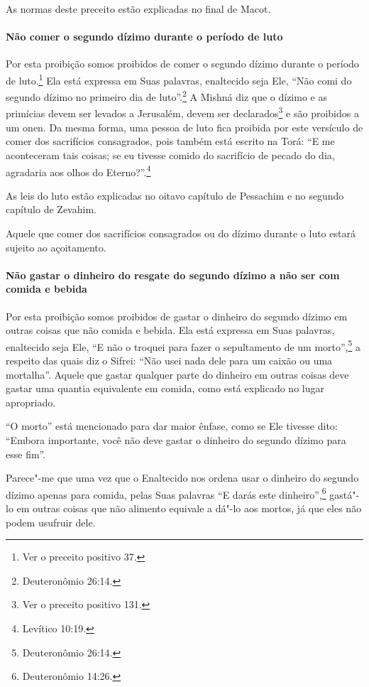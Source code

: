 \begin{multicols}{2}
As normas deste preceito estão explicadas no final de Macot\starr.

\paragraph{Não comer o segundo dízimo durante o período de luto}

Por esta proibição somos proibidos de comer o segundo dízimo durante o
período de luto.\footnote{Ver o preceito positivo 37.} Ela está expressa em Suas
palavras, enaltecido seja Ele, ``Não comi do segundo dízimo no primeiro
dia de luto''.\footnote{Deuteronômio 26:14.} A Mishná\starr{} diz que o dízimo e as
primícias devem ser levados a Jerusalém, devem ser
declarados\footnote{Ver o preceito positivo 131.} e são proibidos a um onen\starr. Da mesma forma, uma pessoa de luto fica
proibida por este versículo de comer dos sacrifícios consagrados, pois
também está escrito na Torá\starr: ``E me aconteceram tais coisas; se eu
tivesse comido do sacrifício de pecado do dia, agradaria aos olhos do
Eterno?''.\footnote{Levítico 10:19.}

As leis do luto estão explicadas no oitavo capítulo de Pessachim\starr{} e no
segundo capítulo de Zevahim\starr.

Aquele que comer dos sacrifícios consagrados ou do dízimo durante o
luto estará sujeito ao açoitamento.

\paragraph{Não gastar o dinheiro do resgate do segundo dízimo a não ser com
comida e bebida}

Por esta proibição somos proibidos de gastar o dinheiro do segundo
dízimo em outras coisas que não comida e bebida. Ela está expressa em
Suas palavras, enaltecido seja Ele, ``E não o troquei para fazer o
sepultamento de um morto'',\footnote{Deuteronômio 26:14.} a respeito das quais
diz o Sifrei\starr: ``Não usei nada dele para um caixão ou uma mortalha''.
Aquele que gastar qualquer parte do dinheiro em outras coisas deve
gastar uma quantia equivalente em comida, como está explicado no lugar
apropriado.

``O morto'' está mencionado para dar maior ênfase, como se Ele tivesse
dito: ``Embora importante, você não deve gastar o dinheiro do segundo
dízimo para esse fim''.

Parece"-me que uma vez que o Enaltecido nos ordena usar o dinheiro do
segundo dízimo apenas para comida, pelas Suas palavras ``E darás este
dinheiro'',\footnote{Deuteronômio 14:26.} gastá"-lo em outras coisas que não
alimento equivale a dá"-lo aos mortos, já que eles não podem usufruir
dele.


\end{multicols}
